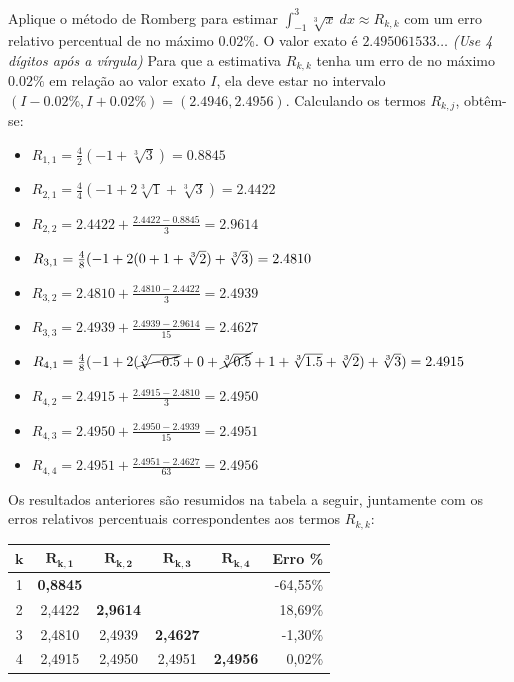 \documentclass[12pt,a4paper]{article}
\begin{document}
\begin{ExerciseList}
\Exercise[title={2,5}]
Aplique o método de Romberg para estimar $\int_{-1}^3 \sqrt[3]{x}\ dx \approx R_{k,k}$ com um erro relativo percentual de no máximo 0.02\%. O valor exato é $2.495061533\ldots$ \textit{\footnotesize(Use 4 dígitos após a vírgula)}
\Answer
Para que a estimativa $R_{k,k}$ tenha um erro de no máximo $0.02\%$ em relação ao valor exato $I$, ela deve estar no intervalo $(I-0.02\%, I+0.02\%) = (\mathbf{2.49}46, \mathbf{2.49}56)$. Calculando os termos $R_{k,j}$, obtêm-se:
\begin{multicols}{2}
\begin{itemize}
\item $R_{1,1}
= \frac{4}{2}(-1 + \sqrt[3]{3})
= 0.8845$
\item $R_{2,1}
= \frac{4}{4}(-1 + 2\sqrt[3]{1} + \sqrt[3]{3})
= 2.4422$
\item $R_{2,2}
= 2.4422+\frac{2.4422-0.8845}{3}
= 2.9614$
\item $R_{3,1}
= \frac{4}{8}(-1 + 2(0 + 1 + \sqrt[3]{2}) + \sqrt[3]{3})\\
= 2.4810$
\item $R_{3,2}
= 2.4810+\frac{2.4810-2.4422}{3}
= 2.4939$
\item $R_{3,3}
= 2.4939+\frac{2.4939-2.9614}{15}
= 2.4627$
\item $R_{4,1}
= \frac{4}{8}(-1 + 2(\cancel{ \sqrt[3]{-0.5} } + 0 + \cancel{ \sqrt[3]{0.5} } + 1 + \sqrt[3]{1.5} + \sqrt[3]{2}) + \sqrt[3]{3})
= 2.4915$
\item $R_{4,2}
= 2.4915+\frac{2.4915-2.4810}{3}
= 2.4950$
\item $R_{4,3}
= 2.4950+\frac{2.4950-2.4939}{15}
= 2.4951$
\item $R_{4,4}
= 2.4951+\frac{2.4951-2.4627}{63}
= 2.4956$
\end{itemize}
\end{multicols}

Os resultados anteriores são resumidos na tabela a seguir, juntamente com os erros relativos percentuais correspondentes aos termos $R_{k,k}$:
\begin{center}
\begin{tabular}{|c|c|c|c|c|r|}
\hline
$\mathbf{k}$ & $\mathbf{ R_{k,1} }$ & $\mathbf{ R_{k,2} }$ & $\mathbf{ R_{k,3} }$ & $\mathbf{ R_{k,4} }$ & \textbf{Erro \%} \\
\hline
1& \textbf{0,8845} &  &  &  & -64,55\% \\
\hline
2& 2,4422 & \textbf{2,9614} & & & 18,69\% \\
\hline
3& 2,4810 & 2,4939 & \textbf{2,4627} & & -1,30\% \\
\hline
4& 2,4915 & 2,4950 & 2,4951 & \textbf{2,4956} & 0,02\% \\
\hline
\end{tabular}
\end{center}


\end{ExerciseList}
\end{document}
